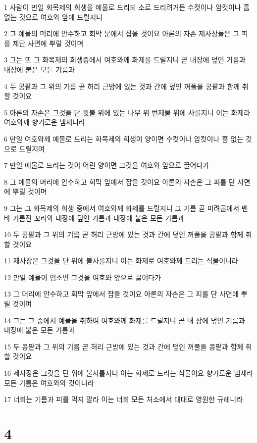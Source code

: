 \par 1 사람이 만일 화목제의 희생을 예물로 드리되 소로 드리려거든 수컷이나 암컷이나 흠 없는 것으로 여호와 앞에 드릴지니
\par 2 그 예물의 머리에 안수하고 회막 문에서 잡을 것이요 아론의 자손 제사장들은 그 피를 제단 사면에 뿌릴 것이며
\par 3 그는 또 그 화목제의 희생중에서 여호와께 화제를 드릴지니 곧 내장에 덮인 기름과 내장에 붙은 모든 기름과
\par 4 두 콩팥과 그 위의 기름 곧 허리 근방에 있는 것과 간에 덮인 꺼풀을 콩팥과 함께 취할 것이요
\par 5 아론의 자손은 그것을 단 윗불 위에 있는 나무 위 번제물 위에 사를지니 이는 화제라 여호와께 향기로운 냄새니라
\par 6 만일 여호와께 예물로 드리는 화목제의 희생이 양이면 수컷이나 암컷이나 흠 없는 것으로 드릴지며
\par 7 만일 예물로 드리는 것이 어린 양이면 그것을 여호와 앞으로 끌어다가
\par 8 그 예물의 머리에 안수하고 회막 앞에서 잡을 것이요 아론의 자손은 그 피를 단 사면에 뿌릴 것이며
\par 9 그는 그 화목제의 희생 중에서 여호와께 화제를 드릴지니 그 기름 곧 미려골에서 벤바 기름진 꼬리와 내장에 덮인 기름과 내장에 붙은 모든 기름과
\par 10 두 콩팥과 그 위의 기름 곧 허리 근방에 있는 것과 간에 덮인 꺼풀을 콩팥과 함께 취할 것이요
\par 11 제사장은 그것을 단 위에 불사를지니 이는 화제로 여호와께 드리는 식물이니라
\par 12 만일 예물이 염소면 그것을 여호와 앞으로 끌어다가
\par 13 그 머리에 안수하고 회막 앞에서 잡을 것이요 아론의 자손은 그 피를 단 사면에 뿌릴 것이며
\par 14 그는 그 중에서 예물을 취하여 여호와께 화제를 드릴지니 곧 내 장에 덮인 기름과 내장에 붙은 모든 기름과
\par 15 두 콩팥과 그 위의 기름 곧 허리 근방에 있는 것과 간에 덮인 꺼풀을 콩팥과 함께 취할 것이요
\par 16 제사장은 그것을 단 위에 불사를지니 이는 화제로 드리는 식물이요 향기로운 냄새라 모든 기름은 여호와의 것이니라
\par 17 너희는 기름과 피를 먹지 말라 이는 너희 모든 처소에서 대대로 영원한 규례니라

\chapter{4}

